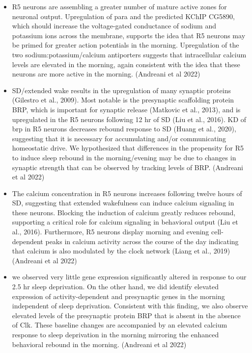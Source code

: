 \documentclass[11pt]{article}
\begin{document}
\begin{itemize}
    \item R5 neurons are assembling a greater number of mature active zones for neuronal output. Upregulation of para and the predicted KChIP CG5890, which should increase the voltage-gated conductance of sodium and potassium ions across the membrane, supports the idea that R5 neurons may be primed for greater action potentials in the morning. Upregulation of the two sodium:potassium/calcium antiporters suggests that intracellular calcium levels are elevated in the morning, again consistent with the idea that these neurons are more active in the morning.
    \parencite{andreaniCircadianProgrammingEllipsoid2022} (Andreani et al 2022)

    \item SD/extended wake results in the upregulation of many synaptic proteins (Gilestro et al., 2009). Most notable is the presynaptic scaffolding protein BRP, which is important for synaptic release (Matkovic et al., 2013), and is upregulated in the R5 neurons following 12 hr of SD (Liu et al., 2016). KD of brp in R5 neurons decreases rebound response to SD (Huang et al., 2020), suggesting that it is necessary for accumulating and/or communicating homeostatic drive. We hypothesized that differences in the propensity for R5 to induce sleep rebound in the morning/evening may be due to changes in synaptic strength that can be observed by tracking levels of BRP.
    \parencite{andreaniCircadianProgrammingEllipsoid2022} (Andreani et al 2022)

    \item The calcium concentration in R5 neurons increases following twelve hours of SD, suggesting that extended wakefulness can induce calcium signaling in these neurons. Blocking the induction of calcium greatly reduces rebound, supporting a critical role for calcium signaling in behavioral output (Liu et al., 2016). Furthermore, R5 neurons display morning and evening cell-dependent peaks in calcium activity across the course of the day indicating that calcium is also modulated by the clock network (Liang et al., 2019)
    \parencite{andreaniCircadianProgrammingEllipsoid2022} (Andreani et al 2022)

    \item we observed very little gene expression significantly altered in response to our 2.5 hr sleep deprivation. On the other hand, we did identify elevated expression of activity-dependent and presynaptic genes in the morning independent of sleep deprivation. Consistent with this finding, we also observe elevated levels of the presynaptic protein BRP that is absent in the absence of Clk. These baseline changes are accompanied by an elevated calcium response to sleep deprivation in the morning mirroring the enhanced behavioral rebound in the morning.
    \parencite{andreaniCircadianProgrammingEllipsoid2022} (Andreani et al 2022)


\end{itemize}
\end{document}
